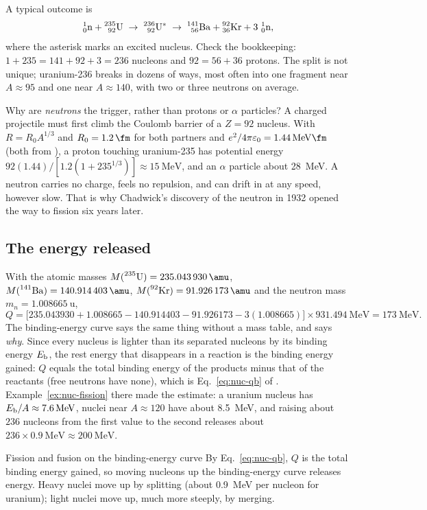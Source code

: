 A typical outcome is
\[
\prescript{1}{0}{\mathrm{n}}+\prescript{235}{92}{\mathrm{U}}\;\to\;\prescript{236}{92}{\mathrm{U}}^{*}\;\to\;\prescript{141}{56}{\mathrm{Ba}}+\prescript{92}{36}{\mathrm{Kr}}+3\,\prescript{1}{0}{\mathrm{n}},
\]
where the asterisk marks an excited nucleus. Check the bookkeeping: $1+235=141+92+3=236$ nucleons and
$92=56+36$ protons. The split is not unique; uranium-236 breaks in dozens of ways, most often into one
fragment near $A\approx95$ and one near $A\approx140$, with two or three neutrons on average.

Why are \emph{neutrons} the trigger, rather than protons or $\alpha$ particles? A charged projectile must
first climb the Coulomb barrier of a $Z=92$ nucleus. With $R=R_0A^{1/3}$ and $R_0=\SI{1.2}{\fm}$ for both
partners and $e^2/4\pi\varepsilon_0=\SI{1.44}{\MeV\fm}$ (both from ), a proton
touching uranium-235 has potential energy $92(1.44)/[1.2(1+235^{1/3})]\approx\SI{15}{\MeV}$, and an
$\alpha$ particle about \SI{28}{\MeV}. A neutron carries no charge, feels no repulsion, and can drift in
at any speed, however slow. That is why Chadwick's discovery of the neutron in 1932 opened the way to
fission six years later.

\subsection{The energy released}

With the atomic masses $M(\iso{235}{U})=\SI{235.043930}{\amu}$, $M(\iso{141}{Ba})=\SI{140.914403}{\amu}$,
$M(\iso{92}{Kr})=\SI{91.926173}{\amu}$ and the neutron mass $m_n=\SI{1.008665}{\amu}$,
\[
Q=\big[\num{235.043930}+\num{1.008665}-\num{140.914403}-\num{91.926173}-3(\num{1.008665})\big]\times\SI{931.494}{\MeV}
=\SI{173}{\MeV}.
\]
The binding-energy curve says the same thing without a mass table, and says \emph{why}. Since every
nucleus is lighter than its separated nucleons by its binding energy $E_{\mathrm{b}}$, the rest energy that
disappears in a reaction is the binding energy gained: $Q$ equals the total binding energy of the
products minus that of the reactants (free neutrons have none), which is Eq.~\eqref{eq:nuc-qb} of . Example~\ref{ex:nuc-fission} there made the
estimate: a uranium nucleus has $\Eb/A\approx\SI{7.6}{\MeV}$, nuclei near $A\approx120$ have about
\SI{8.5}{\MeV}, and raising about $236$ nucleons from the first value to the second releases about
$236\times\SI{0.9}{\MeV}\approx\SI{200}{\MeV}$.

\begin{keybox}{Fission and fusion on the binding-energy curve}
By Eq.~\eqref{eq:nuc-qb}, $Q$ is the total binding energy gained, so moving nucleons up the
binding-energy curve releases energy. Heavy nuclei move up by splitting (about
\SI{0.9}{\MeV} per nucleon for uranium); light nuclei move up, much more steeply, by merging.
\end{keybox}

